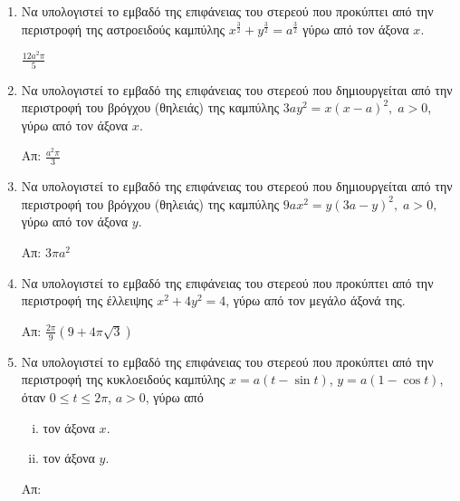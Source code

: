 


\everymath{\displaystyle}
\thispagestyle{empty}



\begin{center}
\end{center}

\vspace{\baselineskip}


\begin{enumerate}

\item Να υπολογιστεί το εμβαδό της επιφάνειας του στερεού που προκύπτει από την
	περιστροφή της αστροειδούς καμπύλης $ x^{\frac{3}{2}} + y^{\frac{3}{2}} 
    = a^{\frac{3}{2}} $ γύρω από τον άξονα $x$. 

	\hfill $ \frac{12 a^{2}\pi}{5}  $ 

\item Να υπολογιστεί το εμβαδό της επιφάνειας του στερεού που δημιουργείται από 
    την περιστροφή του βρόγχου (θηλειάς) της καμπύλης $ 3ay^{2} = x(x-a)^{2}, \; a>0 $,
    γύρω από τον άξονα $x$.

\hfill Απ: $ \frac{a^{2} \pi}{3}  $

\item Να υπολογιστεί το εμβαδό της επιφάνειας του στερεού που δημιουργείται από 
    την περιστροφή του βρόγχου (θηλειάς) της καμπύλης $ 9ax^{2} = y(3a-y)^{2}, \;
    a>0, $ γύρω από τον άξονα $y$.

    \hfill Απ: $ 3 \pi a^{2} $ 


\item Να υπολογιστεί το εμβαδό της επιφάνειας του στερεού που προκύπτει από την 
    περιστροφή της έλλειψης $ x^{2} + 4y^{2} = 4 $, γύρω από τον μεγάλο άξονά της.

	\hfill Απ: $ \frac{2 \pi}{9} (9 + 4 \pi \sqrt{3}) $

\item Να υπολογιστεί το εμβαδό της επιφάνειας του στερεού που προκύπτει από την 
    περιστροφή της κυκλοειδούς καμπύλης $ x = a (t - \sin{t}) $, $ y 
    = a(1 - \cos{t}) $, όταν $ 0 \leq t \leq 2 \pi $, $ a>0 $, γύρω από
	\begin{enumerate}[i)]
	\item 	τον άξονα $x$.
	\item τον άξονα $y$.
\end{enumerate}	

\hfill Απ:  

		 
\end{enumerate}


